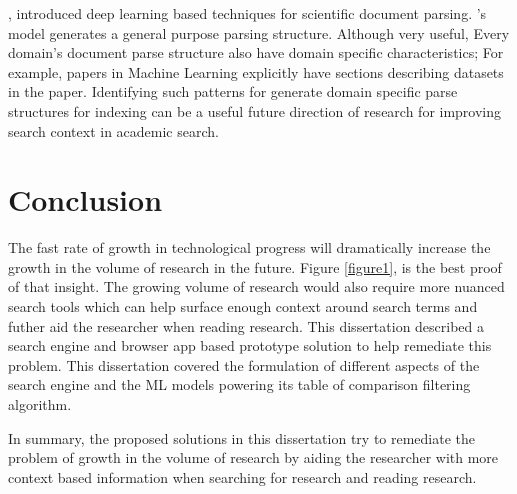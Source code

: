 \cite{kashyap2020sciwing}, introduced deep learning based techniques for scientific document parsing. \cite{kashyap2020sciwing}'s model generates a general purpose parsing structure. Although very useful, Every domain's document parse structure also have domain specific characteristics; For example, papers in Machine Learning explicitly have sections describing datasets in the paper. Identifying such patterns for generate domain specific parse structures for indexing can be a useful future direction of research for improving search context in academic search.

\section{Conclusion}
The fast rate of growth in technological progress will dramatically increase the growth in the volume of research in the future. Figure \ref{figure1}, is the best proof of that insight. The growing volume of research would also require more nuanced search tools which can help surface enough context around search terms and futher aid the researcher when reading research. This dissertation described a search engine and browser app based prototype solution to help remediate this problem. This dissertation covered the formulation of different aspects of the search engine and the ML models powering its table of comparison filtering algorithm. 

In summary, the proposed solutions in this dissertation try to remediate the problem of growth in the volume of research by aiding the researcher with more context based information when searching for research and reading research.